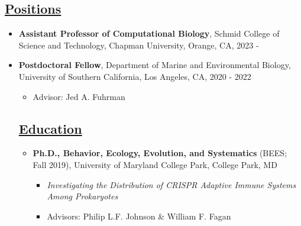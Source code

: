 \documentclass[]{res}
\begin{document}
 
 \small
{} %
 
 

\address{{\bf pronouns:} they/them/theirs {\emph{or}} she/her/hers\\ {\bf email:} jakeweis@usc.edu}
\address{{\bf website:} https://jlw-ecoevo.github.io\\ {\bf twitter:} @jlw\_ecoevo}

 
\begin{resume} 
 

 \section{\underline{Positions}} %
\begin{itemize}[leftmargin=*]
\setlength\itemsep{0.5em}
\item[] {\bf Assistant Professor of Computational Biology}, Schmid College of Science and Technology, Chapman University, Orange, CA, 2023 - 
\item[] {\bf Postdoctoral Fellow}, Department of Marine and Environmental Biology, University of Southern California, Los Angeles, CA, 2020 - 2022
 \begin{itemize}
\item[] Advisor: Jed A. Fuhrman
\end{itemize}


\section{\underline{Education}} %

\begin{itemize}[leftmargin=*]
\setlength\itemsep{0.5em}
\item[] {\bf Ph.D., Behavior, Ecology, Evolution, and Systematics} (BEES; Fall 2019),
University of Maryland College Park, College Park, MD
\begin{itemize}
\item[] \emph{Investigating the Distribution of CRISPR Adaptive Immune Systems Among Prokaryotes}
\item[] Advisors: Philip L.F. Johnson \& William F. Fagan
\end{itemize}


\end{itemize}
\end{itemize}
\end{resume}
\end{document}
